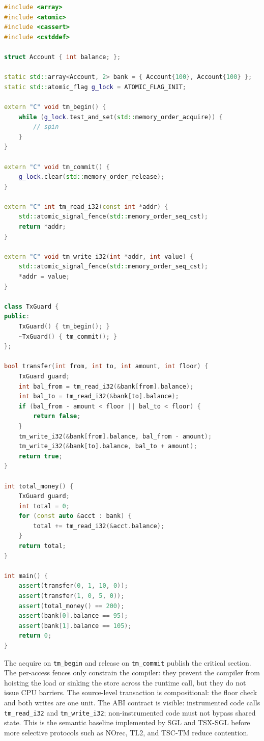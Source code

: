 \begin{lstlisting}[language=C++, caption={A compilable C++ TM facade for the
bank-transfer invariant.}, label={lst:abi-safe-bank}]
#include <array>
#include <atomic>
#include <cassert>
#include <cstddef>

struct Account { int balance; };

static std::array<Account, 2> bank = { Account{100}, Account{100} };
static std::atomic_flag g_lock = ATOMIC_FLAG_INIT;

extern "C" void tm_begin() {
    while (g_lock.test_and_set(std::memory_order_acquire)) {
        // spin
    }
}

extern "C" void tm_commit() {
    g_lock.clear(std::memory_order_release);
}

extern "C" int tm_read_i32(const int *addr) {
    std::atomic_signal_fence(std::memory_order_seq_cst);
    return *addr;
}

extern "C" void tm_write_i32(int *addr, int value) {
    std::atomic_signal_fence(std::memory_order_seq_cst);
    *addr = value;
}

class TxGuard {
public:
    TxGuard() { tm_begin(); }
    ~TxGuard() { tm_commit(); }
};

bool transfer(int from, int to, int amount, int floor) {
    TxGuard guard;
    int bal_from = tm_read_i32(&bank[from].balance);
    int bal_to = tm_read_i32(&bank[to].balance);
    if (bal_from - amount < floor || bal_to < floor) {
        return false;
    }
    tm_write_i32(&bank[from].balance, bal_from - amount);
    tm_write_i32(&bank[to].balance, bal_to + amount);
    return true;
}

int total_money() {
    TxGuard guard;
    int total = 0;
    for (const auto &acct : bank) {
        total += tm_read_i32(&acct.balance);
    }
    return total;
}

int main() {
    assert(transfer(0, 1, 10, 0));
    assert(transfer(1, 0, 5, 0));
    assert(total_money() == 200);
    assert(bank[0].balance == 95);
    assert(bank[1].balance == 105);
    return 0;
}
\end{lstlisting}

The acquire on \texttt{tm\_begin} and release on \texttt{tm\_commit} publish
the critical section. The per-access fences only constrain the compiler: they
prevent the compiler from hoisting the load or sinking the store across the
runtime call, but they do not issue CPU barriers. The source-level transaction
is compositional: the floor check and both writes are one unit. The ABI
contract is visible: instrumented code calls \texttt{tm\_read\_i32} and
\texttt{tm\_write\_i32}; non-instrumented code must not bypass shared state.
This is the semantic baseline implemented by SGL and TSX-SGL before more
selective protocols such as NOrec, TL2, and TSC-TM reduce contention.

